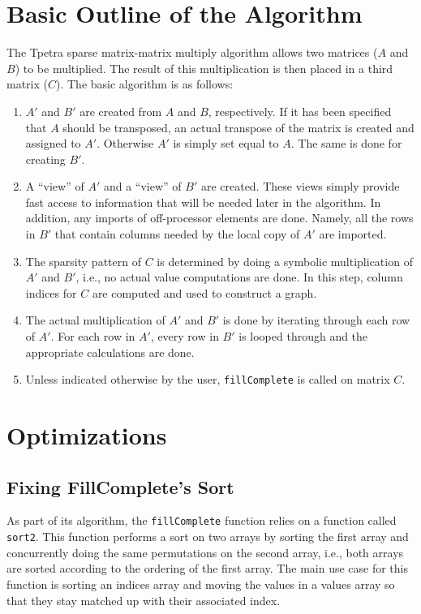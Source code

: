 \documentclass[pdf,12pt]{SANDreport}
\newcommand{\Aprime}{\ensuremath{A'}\xspace}
\newcommand{\Bprime}{\ensuremath{B'}\xspace}
\begin{document}
\section{Basic Outline of the Algorithm}
The Tpetra sparse matrix-matrix multiply algorithm allows two matrices ($A$ and $B$) to be multiplied. The result of this 
multiplication is then placed in a third matrix ($C$).
The basic algorithm is as follows:
\begin{enumerate}
  \item \Aprime and \Bprime are created from $A$ and $B$, respectively. If it has been specified that $A$ should be 
  transposed, an actual 
  transpose of the matrix is created and assigned to \Aprime. Otherwise \Aprime is simply set equal to $A$. The same is 
  done for creating \Bprime.
  \item A ``view'' of \Aprime and a ``view'' of \Bprime are created. These views simply provide fast access to information 
  that will be needed later in the algorithm. In addition, any imports of off-processor elements are done. Namely, all the 
  rows in \Bprime that contain columns needed by the local copy of \Aprime are imported.
  \item The sparsity pattern of $C$ is determined by doing a symbolic multiplication of \Aprime and \Bprime, i.e., no actual
  value computations are done. In this step, column indices for $C$ are computed and used to construct a graph.
  \item The actual multiplication of \Aprime and \Bprime is done by iterating through each row of \Aprime. For each row in 
  \Aprime, every row in \Bprime is looped through and the appropriate calculations are done.
  \item Unless indicated otherwise by the user, \verb!fillComplete! is called on matrix $C$.
\end{enumerate}

\section{Optimizations}

\subsection{Fixing FillComplete's Sort}
As part of its algorithm, the \verb!fillComplete! function relies on a function called \verb!sort2!. This function performs 
a sort on two arrays by sorting the first array and concurrently doing the same permutations on the second array, 
i.e., both arrays are sorted according to the ordering of the first array. The main use case for this function is sorting 
an indices array and moving the values in a values array so that they stay matched up with their associated index.
\end{document}
